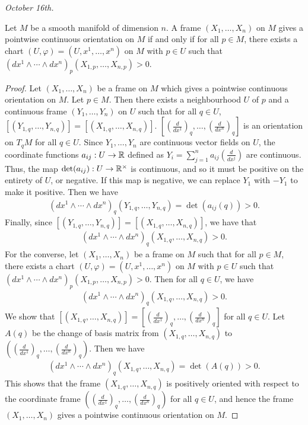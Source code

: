 \textit{October 16th.}

\begin{proposition}
    Let $M$ be a smooth manifold of dimension $n$. A frame $(X_{1},\ldots,X_{n})$ on $M$ gives a pointwise continuous orientation on $M$ if and only if for all $p \in M$, there exists a chart $(U,\varphi) = (U,x^{1},\ldots,x^{n})$ on $M$ with $p \in U$ such that $(dx^{1} \wedge \cdots \wedge dx^{n})_{p}(X_{1,p},\ldots,X_{n,p}) > 0$.
\end{proposition}
\begin{proof}
    Let $(X_{1},\ldots,X_{n})$ be a frame on $M$ which gives a pointwise continuous orientation on $M$. Let $p \in M$. Then there exists a neighbourhood $U$ of $p$ and a continuous frame $(Y_{1},\ldots,Y_{n})$ on $U$ such that for all $q \in U$, $[(Y_{1,q},\ldots,Y_{n,q})] = [(X_{1,q},\ldots,X_{n,q})]$. $[(\frac{d}{dx^{1}})_{q},\ldots,(\frac{d}{dx^{n}})_{q}]$ is an orientation on $T_{q}M$ for all $q \in U$. Since $Y_{1},\ldots,Y_{n}$ are continuous vector fields on $U$, the coordinate functions $a_{ij}:U \to \mathbb{R}$ defined as $Y_{i} = \sum_{j=1}^{n} a_{ij}(\frac{d}{dx^{j}})$ are continuous. Thus, the map $\det(a_{ij}):U \to \mathbb{R}^{\times}$ is continuous, and so it must be positive on the entirety of $U$, or negative. If this map is negative, we can replace $Y_{1}$ with $-Y_{1}$ to make it positive. Then we have
    \begin{align}
        (dx^{1} \wedge \cdots \wedge dx^{n})_{q}(Y_{1,q},\ldots,Y_{n,q}) = \det(a_{ij}(q)) > 0.
    \end{align}
    Finally, since $[(Y_{1,q},\ldots,Y_{n,q})] = [(X_{1,q},\ldots,X_{n,q})]$, we have that
    \begin{align}
        (dx^{1} \wedge \cdots \wedge dx^{n})_{q}(X_{1,q},\ldots,X_{n,q}) > 0.
    \end{align}
    For the converse, let $(X_{1},\ldots,X_{n})$ be a frame on $M$ such that for all $p \in M$, there exists a chart $(U,\varphi) = (U,x^{1},\ldots,x^{n})$ on $M$ with $p \in U$ such that $(dx^{1} \wedge \cdots \wedge dx^{n})_{p}(X_{1,p},\ldots,X_{n,p}) > 0$. Then for all $q \in U$, we have
    \begin{align}
        (dx^{1} \wedge \cdots \wedge dx^{n})_{q}(X_{1,q},\ldots,X_{n,q}) > 0.
    \end{align}
    We show that $[(X_{1,q},\ldots,X_{n,q})] = [(\frac{d}{dx^{1}})_{q},\ldots,(\frac{d}{dx^{n}})_{q}]$ for all $q \in U$. Let $A(q)$ be the change of basis matrix from $(X_{1,q},\ldots,X_{n,q})$ to $((\frac{d}{dx^{1}})_{q},\ldots,(\frac{d}{dx^{n}})_{q})$. Then we have
    \begin{align}
        (dx^{1} \wedge \cdots \wedge dx^{n})_{q}(X_{1,q},\ldots,X_{n,q}) = \det(A(q)) > 0.
    \end{align}
    This shows that the frame $(X_{1,q},\ldots,X_{n,q})$ is positively oriented with respect to the coordinate frame $((\frac{d}{dx^{1}})_{q},\ldots,(\frac{d}{dx^{n}})_{q})$ for all $q \in U$, and hence the frame $(X_{1},\ldots,X_{n})$ gives a pointwise continuous orientation on $M$.
\end{proof}

